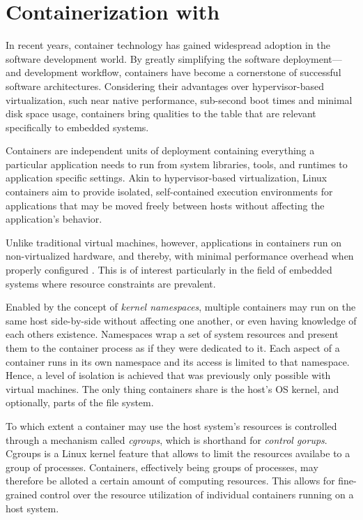 
\section{Containerization with \docker}

In recent years, container technology has gained widespread adoption in the software development world. By greatly simplifying the software deployment—and development workflow, containers have become a cornerstone of successful software architectures.
Considering their advantages over hypervisor-based virtualization, such near native performance, sub-second boot times \cite{felter2015updated,morabito2015hypervisors} and minimal disk space usage, containers bring qualities to the table that are relevant specifically to embedded systems.

Containers are independent units of deployment containing everything a particular application needs to run from system libraries, tools, and runtimes to application specific settings. 
Akin to hypervisor-based virtualization, Linux containers aim to provide isolated, self-contained execution environments for applications that may be moved freely between hosts without affecting the application’s behavior.

Unlike traditional virtual machines, however, applications in containers run on non-virtualized hardware, and thereby, with minimal performance overhead when properly configured  \cite{felter2015updated,morabito2015hypervisors}. This is of interest particularly in the field of embedded systems where resource constraints are prevalent.

Enabled by the concept of \emph{kernel namespaces}, multiple containers may run on the same host side-by-side without affecting one another, or even having knowledge of each others existence. 
Namespaces wrap a set of system resources and present them to the container process as if they were dedicated to it. Each aspect of a container runs in its own namespace and its access is limited to that namespace. Hence, a level of isolation is achieved that was previously only possible with virtual machines. The only thing containers share is the host’s OS kernel, and optionally, parts of the file system.

To which extent a container may use the host system's resources is controlled through a mechanism called \emph{cgroups}, which is shorthand for \emph{control gorups}. 
Cgroups is a Linux kernel feature that allows to limit the resources availabe to a group of processes. Containers, effectively being groups of processes, may therefore be alloted a certain amount of computing resources. This allows for fine-grained control over the resource utilization of individual containers running on a host system.


